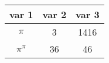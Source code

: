 \documentclass[a4paper,11pt,twocolumn]{article}
\begin{document}
\begin{tabular}{c c c}
var 1               & var 2 & var 3  \\ \hline
$\pi$               & 3     & 1416   \\
$\pi^{\pi}$         & 36    & 46     \\
\end{tabular}
\end{document}
